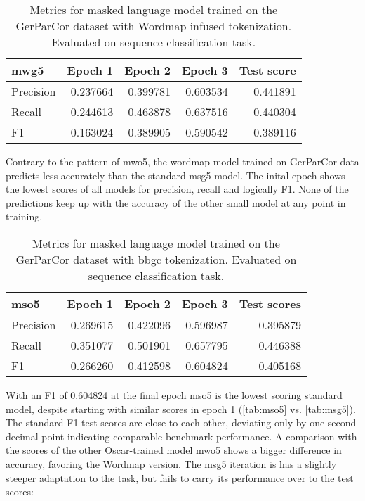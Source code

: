 \begin{table}[H]
    \centering
    \caption[Metrics for model mwg5]{Metrics for masked language model trained on the GerParCor dataset with Wordmap infused tokenization. Evaluated on sequence classification task.}
    \label{tab:mwg5}
    \begin{tabular}{lrrrr}
        \toprule
        \textbf{mwg5} & \textbf{Epoch 1} & \textbf{Epoch 2} & \textbf{Epoch 3} & \textbf{Test score} \\
        \midrule
        Precision & 0.237664 & 0.399781 & 0.603534 & 0.441891 \\
        Recall & 0.244613 & 0.463878 & 0.637516 & 0.440304 \\
        F1 & 0.163024 & 0.389905 & 0.590542 & 0.389116 \\
        \bottomrule
    \end{tabular}
\end{table}

Contrary to the pattern of mwo5, the wordmap model trained on GerParCor data predicts less accurately than the standard msg5 model.
The inital epoch shows the lowest scores of all models for precision, recall and logically F1.
None of the predictions keep up with the accuracy of the other small model at any point in training.

\begin{table}[H]
    \centering
    \caption[Metrics for model mso5]{Metrics for masked language model trained on the GerParCor dataset with \ac{bbgc} tokenization. Evaluated on sequence classification task.}
    \label{tab:mso5}
    \begin{tabular}{lrrrr}
        \toprule
        \textbf{mso5} & \textbf{Epoch 1} & \textbf{Epoch 2} & \textbf{Epoch 3} & \textbf{Test scores} \\
        \midrule
        Precision & 0.269615 & 0.422096 & 0.596987 & 0.395879 \\
        Recall & 0.351077 & 0.501901 & 0.657795 & 0.446388 \\
        F1 & 0.266260 & 0.412598 & 0.604824 & 0.405168 \\
        \bottomrule
    \end{tabular}
\end{table}

With an F1 of 0.604824 at the final epoch mso5 is the lowest scoring standard model, despite starting with similar scores in epoch 1 (\autoref{tab:mso5} vs. \autoref{tab:msg5}).
The standard F1 test scores are close to each other, deviating only by one second decimal point indicating comparable benchmark performance.
A comparison with the scores of the other Oscar-trained model mwo5 shows a bigger difference in accuracy, favoring the Wordmap version.
The msg5 iteration is has a slightly steeper adaptation to the task, but fails to carry its performance over to the test scores:

